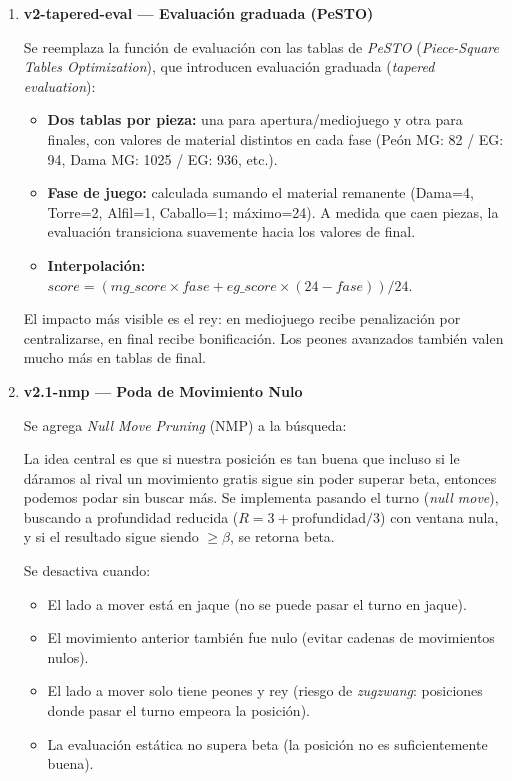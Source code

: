 \documentclass[12pt]{article}
\begin{document}
\begin{enumerate}[label=\textbf{\arabic*.}]
    \item \textbf{v2-tapered-eval --- Evaluación graduada (PeSTO)}

    Se reemplaza la función de evaluación con las tablas de \textit{PeSTO} (\textit{Piece-Square Tables Optimization}), que introducen evaluación graduada (\textit{tapered evaluation}):
    \begin{itemize}
        \item \textbf{Dos tablas por pieza:} una para apertura/mediojuego y otra para finales, con valores de material distintos en cada fase (Peón MG: 82 / EG: 94, Dama MG: 1025 / EG: 936, etc.).
        \item \textbf{Fase de juego:} calculada sumando el material remanente (Dama=4, Torre=2, Alfil=1, Caballo=1; máximo=24). A medida que caen piezas, la evaluación transiciona suavemente hacia los valores de final.
        \item \textbf{Interpolación:} $\textit{score} = (\textit{mg\_score} \times \textit{fase} + \textit{eg\_score} \times (24 - \textit{fase})) / 24$.
    \end{itemize}
    El impacto más visible es el rey: en mediojuego recibe penalización por centralizarse, en final recibe bonificación. Los peones avanzados también valen mucho más en tablas de final.

    \item \textbf{v2.1-nmp --- Poda de Movimiento Nulo}

    Se agrega \textit{Null Move Pruning} (NMP) a la búsqueda:

    La idea central es que si nuestra posición es tan buena que incluso si le dáramos al rival un movimiento gratis sigue sin poder superar beta, entonces podemos podar sin buscar más. Se implementa pasando el turno (\textit{null move}), buscando a profundidad reducida ($R = 3 + \text{profundidad}/3$) con ventana nula, y si el resultado sigue siendo $\geq \beta$, se retorna beta.

    Se desactiva cuando:
    \begin{itemize}
        \item El lado a mover está en jaque (no se puede pasar el turno en jaque).
        \item El movimiento anterior también fue nulo (evitar cadenas de movimientos nulos).
        \item El lado a mover solo tiene peones y rey (riesgo de \textit{zugzwang}: posiciones donde pasar el turno empeora la posición).
        \item La evaluación estática no supera beta (la posición no es suficientemente buena).
    \end{itemize}


\end{enumerate}
\end{document}
